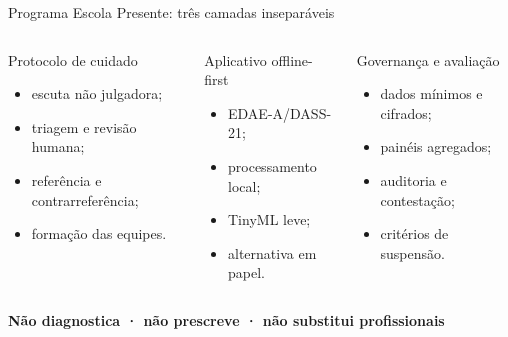 \documentclass[aspectratio=169,11pt]{beamer}
\begin{document}
\begin{frame}{Programa Escola Presente: três camadas inseparáveis}
  \begin{columns}[T,onlytextwidth]
      \begin{block}{\color{NeesWine}Protocolo de cuidado}
        \small
        \begin{itemize}\setlength\itemsep{2mm}
          \item escuta não julgadora;
          \item triagem e revisão humana;
          \item referência e contrarreferência;
          \item formação das equipes.
        \end{itemize}
      \end{block}
      \begin{block}{\color{NeesRed}Aplicativo offline-first}
        \small
        \begin{itemize}\setlength\itemsep{2mm}
          \item EDAE-A/DASS-21;
          \item processamento local;
          \item TinyML leve;
          \item alternativa em papel.
        \end{itemize}
      \end{block}
      \begin{block}{\color{NeesOrange}Governança e avaliação}
        \small
        \begin{itemize}\setlength\itemsep{2mm}
          \item dados mínimos e cifrados;
          \item painéis agregados;
          \item auditoria e contestação;
          \item critérios de suspensão.
        \end{itemize}
      \end{block}
  \end{columns}
  \vfill
  \begin{center}
    {\color{NeesRed}\large\bfseries Não diagnostica · não prescreve · não substitui profissionais}
  \end{center}
\end{frame}
\end{document}
